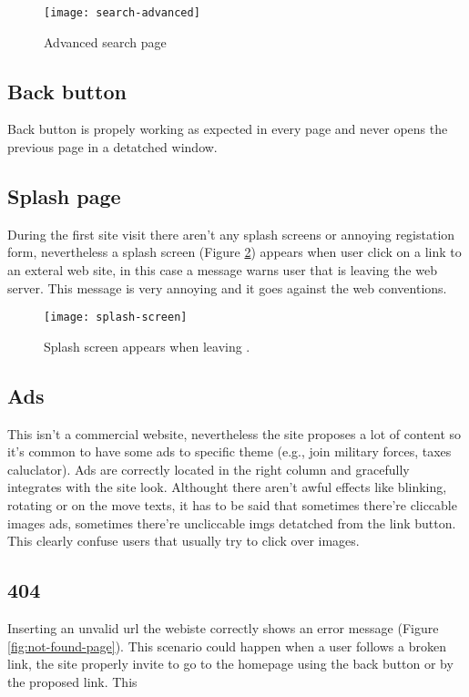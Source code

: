 \documentclass[
10pt, %
a4paper, %
oneside, %
headinclude,footinclude, %
BCOR5mm, %
]{scrartcl}
\begin{document}
	\begin{figure}[h]
	\centering 
	\centerline{\texttt{[image: search-advanced]}}
	\caption[Advanced search page]{Advanced search page}
	\label{fig:search-advanced} 
	\end{figure}


	\subsection{Back button}
	Back button is propely working as expected in every page and never opens the previous page in a detatched window.

	\subsection{Splash page}
	\label{splashpage}
	During the first site visit there aren't any splash screens or annoying registation form, nevertheless a splash screen (Figure \ref{fig:splash-screen}) appears when user click on a link to an exteral web site, in this case a message warns user that is leaving the \thesite{} web server. This message is very annoying and it goes against the web conventions.

	\begin{figure}[h]
	\centering 
	\centerline{\texttt{[image: splash-screen]}}
	\caption[Splash screen]{Splash screen appears when leaving \thesite{}.}
	\label{fig:splash-screen} 
	\end{figure}

	\subsection{Ads}
	This isn't a commercial website, nevertheless the site proposes a lot of content so it's common to have some ads to specific theme (e.g., join military forces, taxes caluclator). Ads are correctly located in the right column and gracefully integrates with the site look. Althought there aren't awful effects like blinking, rotating or on the move texts, it has to be said that sometimes there're cliccable images ads, sometimes there're uncliccable imgs detatched from the link button. This clearly confuse users that usually try to click over images.

	\subsection{404}
	Inserting an unvalid url the webiste correctly shows an error message (Figure \ref{fig:not-found-page}). This scenario could happen when a user follows a broken link, the site properly invite to go to the homepage using the back button or by the proposed link. This 
\end{document}
